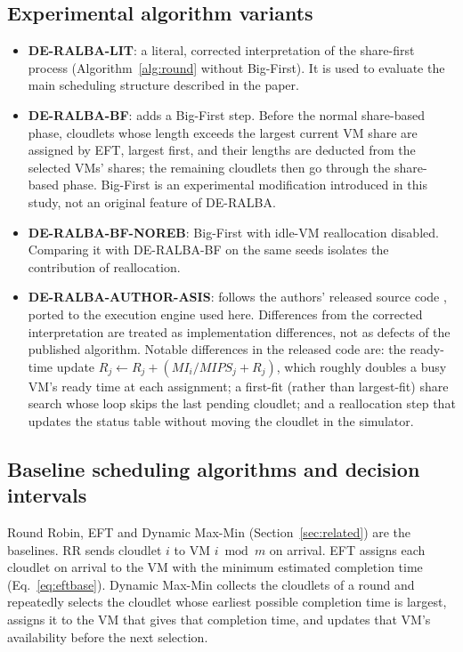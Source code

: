 \documentclass[default,sn-mathphys,Numbered]{sn-jnl}
\begin{document}
\subsection{Experimental algorithm variants}
\begin{itemize}
    \item \textbf{DE-RALBA-LIT}: a literal, corrected interpretation of the share-first process (Algorithm~\ref{alg:round} without Big-First). It is used to evaluate the main scheduling structure described in the paper.
    \item \textbf{DE-RALBA-BF}: adds a Big-First step. Before the normal share-based phase, cloudlets whose length exceeds the largest current VM share are assigned by EFT, largest first, and their lengths are deducted from the selected VMs' shares; the remaining cloudlets then go through the share-based phase. Big-First is an experimental modification introduced in this study, not an original feature of DE-RALBA.
    \item \textbf{DE-RALBA-BF-NOREB}: Big-First with idle-VM reallocation disabled. Comparing it with DE-RALBA-BF on the same seeds isolates the contribution of reallocation.
    \item \textbf{DE-RALBA-AUTHOR-ASIS}: follows the authors' released source code \cite{rehman2025zenodo}, ported to the execution engine used here. Differences from the corrected interpretation are treated as implementation differences, not as defects of the published algorithm. Notable differences in the released code are: the ready-time update $R_j \gets R_j + (\mathit{MI}_i/\mathit{MIPS}_j + R_j)$, which roughly doubles a busy VM's ready time at each assignment; a first-fit (rather than largest-fit) share search whose loop skips the last pending cloudlet; and a reallocation step that updates the status table without moving the cloudlet in the simulator.
\end{itemize}

\subsection{Baseline scheduling algorithms and decision intervals}
Round Robin, EFT and Dynamic Max-Min (Section~\ref{sec:related}) are the baselines. RR sends cloudlet $i$ to VM $i \bmod m$ on arrival. EFT assigns each cloudlet on arrival to the VM with the minimum estimated completion time (Eq.~\ref{eq:eftbase}). Dynamic Max-Min collects the cloudlets of a round and repeatedly selects the cloudlet whose earliest possible completion time is largest, assigns it to the VM that gives that completion time, and updates that VM's availability before the next selection.
\end{document}
